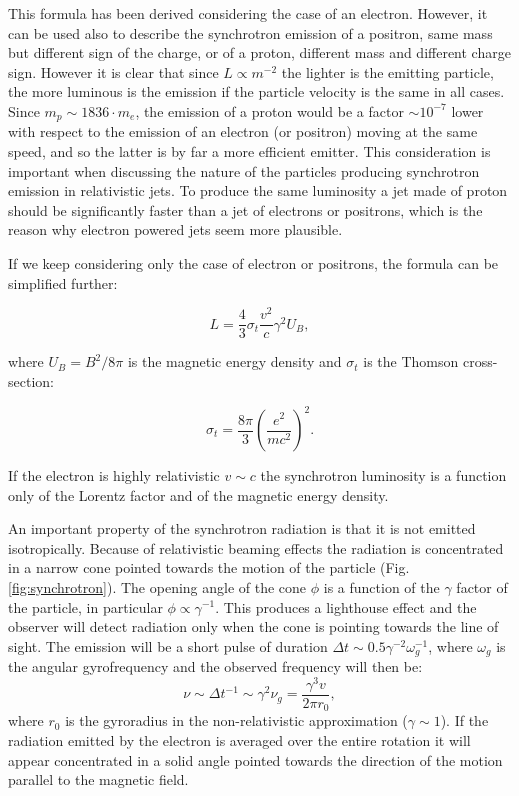 \documentclass[../thesis.tex]{subfiles}
\begin{document}
This formula has been derived considering the case of an electron. 
However, it can be used also to describe the synchrotron emission of a positron, same mass but different sign of the charge, or of a proton, different mass and different charge sign.
However it is clear that since $L\propto m^{-2}$ the lighter is the emitting particle, the more luminous is the emission if the particle velocity is the same in all cases.
Since $m_p \sim 1836\cdot m_e$, the emission of a proton would be a factor $\sim 10^{-7}$ lower with respect to the emission of an electron (or positron) moving at the same speed, and so the latter is by far a more efficient emitter.
This consideration is important when discussing the nature of the particles producing synchrotron emission in relativistic jets.
To produce the same luminosity a jet made of proton should be significantly faster than a jet of electrons or positrons, which is the reason why electron powered jets seem more plausible.

If we keep considering only the case of electron or positrons, the formula can be simplified further:

\begin{equation}
    \label{eq:sync_semp}
    L=\frac{4}{3}\sigma_t\frac{v^2}{c}\gamma^2U_B,
\end{equation}

where $U_B = B^2/8\pi$ is the magnetic energy density and $\sigma_t$ is the Thomson cross-section:

\begin{equation}
    \label{eq:thomson}
    \sigma_t = \frac{8\pi}{3}\left(\frac{e^2}{mc^2}\right)^2.
\end{equation}

If the electron is highly relativistic $v\sim c$ the synchrotron luminosity is a function only of the Lorentz factor and of the magnetic energy density.

An important property of the synchrotron radiation is that it is not emitted isotropically.
Because of relativistic beaming effects the radiation is concentrated in a narrow cone pointed towards the motion of the particle (Fig.\,\ref{fig:synchrotron}).
The opening angle of the cone $\phi$ is a function of the $\gamma$ factor of the particle, in particular $\phi \propto \gamma^{-1}$.
This produces a lighthouse effect and the observer will detect radiation only when the cone is pointing towards the line of sight.
The emission will be a short pulse of duration $\Delta t \sim 0.5\gamma^{-2} \omega_g^{-1}$, where $\omega_g$ is the angular gyrofrequency and the observed frequency will then be:
\begin{equation}
    \label{eq:new_freq}
    \nu \sim \Delta t^{-1} \sim \gamma^2\nu_g = \frac{\gamma^3v}{2\pi r_0},
\end{equation}
where $r_0$ is the gyroradius in the non-relativistic approximation ($\gamma \sim 1$).
If the radiation emitted by the electron is averaged over the entire rotation it will appear concentrated in a solid angle pointed towards the direction of the motion parallel to the magnetic field.
\end{document}
